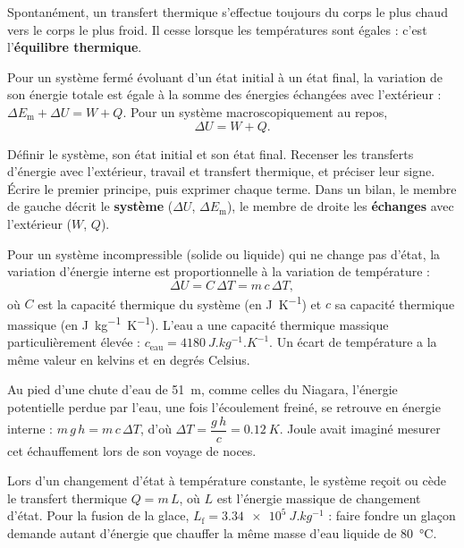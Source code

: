 \begin{propriete}
Spontanément, un transfert thermique s'effectue toujours du corps le plus chaud vers le corps le plus froid. Il cesse
lorsque les températures sont égales : c'est l'\textbf{équilibre thermique}.
\end{propriete}
\begin{loi}
Pour un système fermé évoluant d'un état initial à un état final, la variation de son énergie totale est égale à la
somme des énergies échangées avec l'extérieur : $\Delta E_\mathrm{m}+\Delta U=W+Q$. Pour un système macroscopiquement au
repos,
\[\Delta U=W+Q.\]
\end{loi}
\begin{savoirfaire}
Définir le système, son état initial et son état final. Recenser les transferts d'énergie avec l'extérieur, travail et
transfert thermique, et préciser leur signe. Écrire le premier principe, puis exprimer chaque terme. Dans un bilan, le
membre de gauche décrit le \textbf{système} ($\Delta U$, $\Delta E_\mathrm{m}$), le membre de droite les \textbf{échanges} avec
l'extérieur ($W$, $Q$).
\end{savoirfaire}
\begin{definition}
Pour un système incompressible (solide ou liquide) qui ne change pas d'état, la variation d'énergie interne est
proportionnelle à la variation de température :
\[\Delta U=C\,\Delta T=m\,c\,\Delta T,\]
où $C$ est la capacité thermique du système (en \unit{J.K^{-1}}) et $c$ sa capacité thermique massique (en
\unit{J.kg^{-1}.K^{-1}}). L'eau a une capacité thermique massique particulièrement élevée :
$c_\mathrm{eau}=\qty{4180}{J.kg^{-1}.K^{-1}}$. Un écart de température a la même valeur en kelvins et en degrés Celsius.
\end{definition}
\begin{exemple}
Au pied d'une chute d'eau de \qty{51}{m}, comme celles du Niagara, l'énergie potentielle perdue par l'eau, une fois
l'écoulement freiné, se retrouve en énergie interne : $m\,g\,h=m\,c\,\Delta T$, d'où $\Delta T=\dfrac{g\,h}{c}=\qty{0,12}{K}$.
Joule avait imaginé mesurer cet échauffement lors de son voyage de noces.
\end{exemple}
\begin{propriete}
Lors d'un changement d'état à température constante, le système reçoit ou cède le transfert thermique
$Q=m\,L$, où $L$ est l'énergie massique de changement d'état. Pour la fusion de la glace, $L_\mathrm{f}=\qty{3,34e5}{J.kg^{-1}}$ :
faire fondre un glaçon demande autant d'énergie que chauffer la même masse d'eau liquide de \qty{80}{\degreeCelsius}.
\end{propriete}
